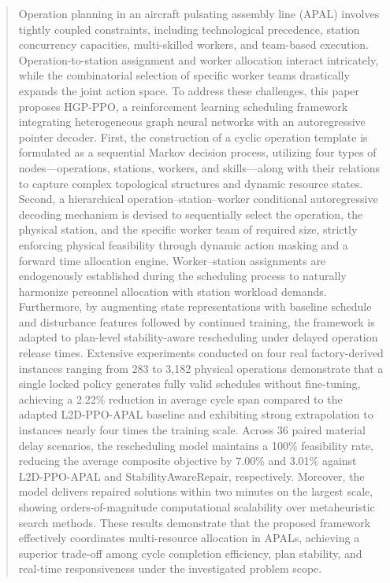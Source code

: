 \documentclass[journal,10pt]{IEEEtran}
\begin{document}
\begin{abstract}
Operation planning in an aircraft pulsating assembly line (APAL) involves tightly coupled constraints, including technological precedence, station concurrency capacities, multi-skilled workers, and team-based execution. Operation-to-station assignment and worker allocation interact intricately, while the combinatorial selection of specific worker teams drastically expands the joint action space. To address these challenges, this paper proposes HGP-PPO, a reinforcement learning scheduling framework integrating heterogeneous graph neural networks with an autoregressive pointer decoder. First, the construction of a cyclic operation template is formulated as a sequential Markov decision process, utilizing four types of nodes---operations, stations, workers, and skills---along with their relations to capture complex topological structures and dynamic resource states. Second, a hierarchical operation--station--worker conditional autoregressive decoding mechanism is devised to sequentially select the operation, the physical station, and the specific worker team of required size, strictly enforcing physical feasibility through dynamic action masking and a forward time allocation engine. Worker--station assignments are endogenously established during the scheduling process to naturally harmonize personnel allocation with station workload demands. Furthermore, by augmenting state representations with baseline schedule and disturbance features followed by continued training, the framework is adapted to plan-level stability-aware rescheduling under delayed operation release times. Extensive experiments conducted on four real factory-derived instances ranging from 283 to 3,182 physical operations demonstrate that a single locked policy generates fully valid schedules without fine-tuning, achieving a 2.22\% reduction in average cycle span compared to the adapted L2D-PPO-APAL baseline and exhibiting strong extrapolation to instances nearly four times the training scale. Across 36 paired material delay scenarios, the rescheduling model maintains a 100\% feasibility rate, reducing the average composite objective by 7.00\% and 3.01\% against L2D-PPO-APAL and StabilityAwareRepair, respectively. Moreover, the model delivers repaired solutions within two minutes on the largest scale, showing orders-of-magnitude computational scalability over metaheuristic search methods. These results demonstrate that the proposed framework effectively coordinates multi-resource allocation in APALs, achieving a superior trade-off among cycle completion efficiency, plan stability, and real-time responsiveness under the investigated problem scope.
\end{abstract}
\end{document}
